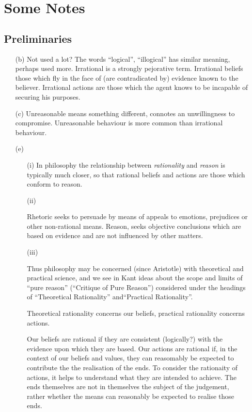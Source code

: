 \documentclass[14pt,titlepage]{extarticle}
\begin{document}
\pagebreak

\section{Some Notes}

\subsection{Preliminaries}

\begin{itemize}
\item[(b)] Not used a lot?
The words ``logical'', ``illogical'' has similar meaning, perhaps used more.
Irrational is a strongly pejorative term.
Irrational beliefs those which fly in the face of (are contradicated by) evidence known to the believer.
Irrational actions are those which the agent knows to be incapable of securing his purposes. 

\item[(c)] Unreasonable means something different, connotes an unwillingness to compromise.
Unreasonable behaviour is more common than irrational behaviour.

\item[(e)]

\begin{itemize}

\item [(i)]
In philosophy the relationship between {\it rationality} and {\it reason} is typically much closer,
so that rational beliefs and actions are those which conform to reason.

\item [(ii)]


Rhetoric seeks to persuade by means of appeals to emotions, prejudices or other non-rational means.
Reason, seeks objective conclusions which are based on evidence and are not influenced by other matters.

\item [(iii)]

Thus philosophy may be concerned (since Aristotle) with theoretical and practical science, and
we see in Kant ideas about the scope and limits of ``pure reason'' (``Critique of Pure Reason'')
considered under the headings of ``Theoretical Rationality'' and``Practical Rationality''.

Theoretical rationality concerns our beliefs, practical rationality concerns actions.

Our beliefs are rational if they are consistent (logically?) with the evidence upon which they are
based.
Our actions are rational if, in the context of our beliefs and values, they can reasomably be expected 
to contribute the the realisation of the ends.
To consider the rationaity of actions, it helps to understand what they are intended to achieve.
The ends themselves are not in themselves the subject of the judgement, rather whether the
means can reasonably be expected to realise those ends.

\end{itemize}

\end{itemize}
\end{document}
